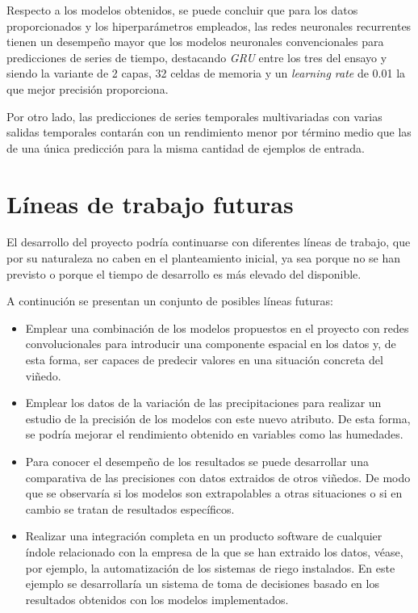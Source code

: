Respecto a los modelos obtenidos, se puede concluir que para los datos proporcionados y los hiperparámetros
empleados, las redes neuronales recurrentes tienen un desempeño mayor que los modelos neuronales
convencionales para predicciones de series de tiempo, destacando \textit{GRU}
entre los tres del ensayo y siendo la variante de 2 capas, 32 celdas de memoria y un \textit{learning rate}
de 0.01 la que mejor precisión proporciona.

Por otro lado, las predicciones de series temporales multivariadas con varias salidas temporales contarán
con un rendimiento menor por término medio que las de una única predicción para la misma cantidad
de ejemplos de entrada.

\section{Líneas de trabajo futuras}
El desarrollo del proyecto podría continuarse con diferentes líneas de trabajo, que por su naturaleza
no caben en el planteamiento inicial, ya sea porque no se han previsto o porque el tiempo
de desarrollo es más elevado del disponible.

A continución se presentan un conjunto de posibles líneas futuras:
\begin{itemize}
    \item Emplear una combinación de los modelos propuestos en el proyecto con redes convolucionales
        para introducir una componente espacial en los datos y, de esta forma, ser capaces de predecir valores
        en una situación concreta del viñedo.
    \item Emplear los datos de la variación de las precipitaciones para realizar un estudio de la precisión
        de los modelos con este nuevo atributo. De esta forma, se podría mejorar el rendimiento obtenido
        en variables como las humedades. 
    \item Para conocer el desempeño de los resultados se puede desarrollar una comparativa de las precisiones
        con datos extraidos de otros viñedos. De modo que se observaría si los modelos son extrapolables
        a otras situaciones o si en cambio se tratan de resultados específicos.
    \item Realizar una integración completa en un producto software de cualquier índole relacionado con
        la empresa de la que se han extraido los datos, véase, por ejemplo, la automatización de los sistemas de riego
        instalados. En este ejemplo se desarrollaría un sistema de toma de decisiones basado en los resultados obtenidos
        con los modelos implementados.
\end{itemize}